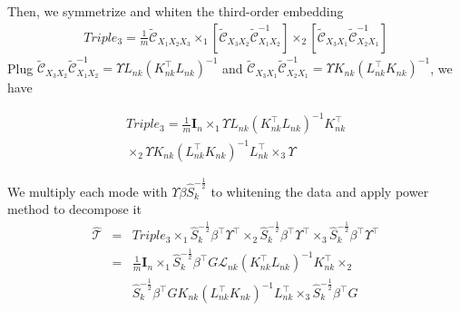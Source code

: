 \documentclass{article}
\begin{document}
%
Then, we symmetrize and whiten the third-order embedding
%
\begin{eqnarray}
Triple_3 = \frac{1}{m}\tilde{\mathcal{C}}_{X_1X_2X_3} \times_1
[\tilde{\mathcal{C}}_{X_3X_2}\tilde{\mathcal{C}}_{X_1X_2}^{-1}]
\times_2
[\tilde{\mathcal{C}}_{X_3X_1}\tilde{\mathcal{C}}_{X_2X_1}^{-1}]
\end{eqnarray}
%
Plug
$\tilde{\mathcal{C}}_{X_3X_2}\tilde{\mathcal{C}}_{X_1X_2}^{-1} =
\Upsilon{L}_{nk}({K}_{nk}^\top{L}_{nk})^{-1}$
and
$\tilde{\mathcal{C}}_{X_3X_1}\tilde{\mathcal{C}}_{X_2X_1}^{-1} =
\Upsilon{K}_{nk}({L}_{nk}^\top{K}_{nk})^{-1}$,
we have

\begin{eqnarray*}
Triple_3  = \frac{1}{m}\bm{I}_n \times_1
\Upsilon{L}_{nk}({K}_{nk}^\top
{L}_{nk})^{-1}{K}_{nk}^\top\\ \times_2
\Upsilon{K}_{nk}({L}_{nk}^\top
{K}_{nk})^{-1}{L}_{nk}^\top \times_3 \Upsilon
\end{eqnarray*}

We multiply each mode with $\Upsilon \beta \hat{S}_k^{-\frac{1}{2}}$ to
whitening the data and apply power method to decompose it
%
\begin{eqnarray*}
\hat{\mathcal{T}} &=& Triple_3 \times_1 \hat{S}_k^{-\frac{1}{2}}\beta^\top\Upsilon^\top \times_2
\hat{S}_k^{-\frac{1}{2}}\beta^\top\Upsilon^\top \times_3 \hat{S}_k^{-\frac{1}{2}}\beta^\top\Upsilon^\top\\
&=& \frac{1}{m}\bm{I}_n \times_1
\hat{S}_k^{-\frac{1}{2}}\beta^\top{G}\mathcal{L}_{nk}({K}_{nk}^\top
{L}_{nk})^{-1}{K}_{nk}^\top \times_2\\
&&\hat{S}_k^{-\frac{1}{2}}\beta^\top{G}{K}_{nk}({L}_{nk}^\top
{K}_{nk})^{-1}{L}_{nk}^\top \times_3
\hat{S}_k^{-\frac{1}{2}}\beta^\top{G}
\end{eqnarray*}
%






\end{document}

